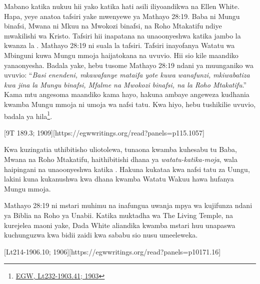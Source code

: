 Mabano katika nukuu hii yako katika hati asili iliyoandikwa na Ellen White. Hapa, yeye anatoa tafsiri yake mwenyewe ya Mathayo 28:19. Baba ni Mungu binafsi, Mwana ni Mkuu na Mwokozi binafsi, na Roho Mtakatifu ndiye mwakilishi wa Kristo. Tafsiri hii inapatana na  unaoonyeshwa katika jambo la kwanza la . Mathayo 28:19 ni suala la tafsiri. Tafsiri inayofanya Watatu wa Mbinguni kuwa Mungu mmoja haijatokana na uvuvio. Hii sio kile maandiko yanaonyesha. Badala yake, hebu tusome Mathayo 28:19 ndani ya muunganiko wa uvuvio: “\textit{Basi enendeni, mkawafanye mataifa yote kuwa wanafunzi, mkiwabatiza kwa jina la Mungu binafsi, Mfalme na Mwokozi binafsi, na la Roho Mtakatifu}.” Kama mtu angesoma maandiko kama hayo, hakuna ambaye angeweza kudhania kwamba Mungu mmoja ni umoja wa nafsi tatu. Kwa hiyo, hebu tushikilie uvuvio, badala ya hila\footnote{\href{https://egwwritings.org/?ref=en\_Lt232-1903.41&para=10197.50}{{EGW, Lt232-1903.41; 1903}}}.

[9T 189.3; 1909][https://egwwritings.org/read?panels=p115.1057]

Kwa kuzingatia uthibitisho uliotolewa, tunaona kwamba kuhesabu tu Baba, Mwana na Roho Mtakatifu, haithibitishi dhana ya \textit{watatu-katika-moja}, wala haipingani na  unaoonyeshwa katika . Hakuna kukataa kwa nafsi tatu za Uungu, lakini kuna kukanushwa kwa dhana kwamba Watatu Wakuu hawa hufanya Mungu mmoja.

Mathayo 28:19 ni mstari muhimu na inafungua uwanja mpya wa kujifunza ndani ya Biblia na Roho ya Unabii. Katika muktadha wa The Living Temple, na kurejelea maoni yake, Dada White aliandika kwamba mstari huu unapaswa kuchunguzwa kwa bidii zaidi kwa sababu sio nusu umeeleweka.

[Lt214-1906.10; 1906][https://egwwritings.org/read?panels=p10171.16]

